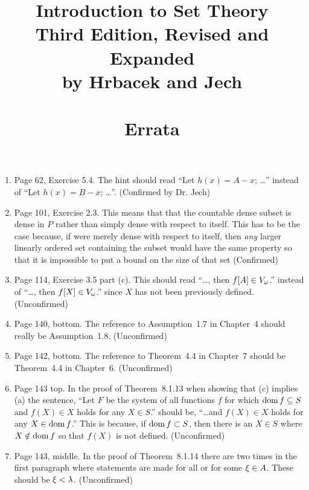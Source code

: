 \documentclass{report}
\title{
  Introduction to Set Theory \\
  Third Edition, Revised and Expanded \\
  by Hrbacek and Jech \\
  \ \\
  Errata
}
\begin{document}


\maketitle

\begin{enumerate}

\item Page 62, Exercise 5.4. The hint should read ``Let $h(x) = A - x$; \ldots'' instead of ``Let $h(x) = B - x$; \ldots''.
  (Confirmed by Dr. Jech)

\item Page 101, Exercise 2.3. This means that that the countable dense subset is dense in $P$ rather than simply dense with respect to itself.
  This has to be the case because, if were merely dense with respect to itself, then \emph{any} larger linearly ordered set containing the subset would have the same property so that it is impossible to put a bound on the size of that set (Confirmed)

\item Page 114, Exercise 3.5 part (c). This should read ``\ldots, then $f[A] \in V_\omega$.'' instead of ``\ldots, then $f[X] \in V_\omega$.'' since $X$ has not been previously defined. (Unconfirmed)

\item Page 140, bottom. The reference to Assumption~1.7 in Chapter~4 should really be Assumption~1.8. (Unconfirmed)

\item Page 142, bottom. The reference to Theorem~4.4 in Chapter~7 should be Theorem~4.4 in Chapter~6. (Unconfirmed)

\item Page 143 top. In the proof of Theorem~8.1.13 when showing that (c) implies (a) the sentence, ``Let $F$ be the system of all functions $f$ for which $\mathrm{dom}\,{f} \subseteq S$ and $f(X) \in X$ holds for any $X \in S$.'' should be, ``\ldots and $f(X) \in X$ holds for any $X \in \mathrm{dom}\,{f}$.''
  This is because, if $\mathrm{dom}\,{f} \subset S$, then there is an $X \in S$ where $X \notin \mathrm{dom}\,{f}$ so that $f(X)$ is not defined. (Unconfirmed)

\item Page 143, middle. In the proof of Theorem~8.1.14 there are two times in the first paragraph where statements are made for all or for some $\xi \in A$.
  These should be $\xi < \lambda$. (Unconfirmed)
  
\end{enumerate}
\end{document}
